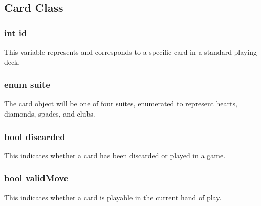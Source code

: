 \subsection{Card Class}

\subsubsection{int id}
	This variable represents and corresponds to a specific card in a standard playing deck.
\subsubsection{enum suite}
	The card object will be one of four suites, enumerated to represent hearts, diamonds, spades, and clubs.
\subsubsection{bool discarded}
	This indicates whether a card has been discarded or played in a game.
\subsubsection{bool validMove}
	This indicates whether a card is playable in the current hand of play.

